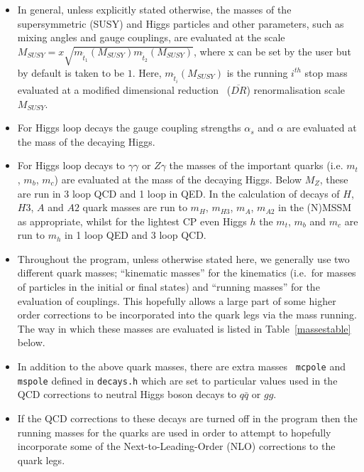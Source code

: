 \documentclass[final,3p,times]{elsarticle}
\begin{document}
\begin{itemize}
\item In general, unless explicitly stated otherwise, the masses of the
  supersymmetric (SUSY) and Higgs particles and other parameters, such as
  mixing angles and gauge couplings, are evaluated at the scale $M_{SUSY} =
  x\sqrt{m_{\tilde{t}_1}(M_{SUSY})m_{\tilde{t}_2}(M_{SUSY})}$, where x can be
  set by the user but by default is taken to be $1$. Here,
  $m_{\tilde{t}_i}(M_{SUSY})$ is the running $i^{th}$ stop mass evaluated at
  a modified dimensional reduction~\cite{Jones:1994} ($\overline{DR}$) renormalisation scale
  $M_{SUSY}$.  
\item For Higgs loop decays the gauge coupling strengths $\alpha_s$ and $\alpha$ are evaluated at the mass of the decaying Higgs.
\item For Higgs loop decays to $\gamma\gamma$ or $Z\gamma$ the masses of the
 important  quarks (i.e. $m_{t}$, $m_{b}$,  $m_{c}$) are evaluated at
 the mass of the decaying Higgs. Below $M_Z$, these are run in 3 loop
 QCD and 1 loop in QED\@. 
In the calculation of decays of $H$, $H3$, $A$ and $A2$ quark masses  are run
to $m_H$, $m_{H3}$, $m_{A}$, $m_{A2}$ 
in the (N)MSSM as appropriate, whilst for the lightest CP even Higgs $h$ the
$m_{t}$, $m_{b}$ and $m_{c}$ are run to $m_h$ in 1 loop QED and 3 loop QCD. 
\item Throughout the program, unless otherwise stated here, we generally use two
  different quark masses; ``kinematic masses'' for the kinematics (i.e.\ for
  masses of particles in the initial or final states) and ``running masses''
  for the evaluation of couplings.  This hopefully allows a large part of some
  higher order  corrections 
  to be incorporated into the quark legs via the mass
  running. The way in which these masses are evaluated is listed in Table~\ref{massestable} below. 
\item In addition to the above quark masses, there are extra masses {\tt
    mcpole} and {\tt mspole} defined in {\tt decays.h} which are set
  to particular values used in the QCD corrections to neutral
  Higgs boson decays to $q \bar{q}$ or $gg$. 
\item If the QCD corrections to these decays are turned off in the program then
  the running masses for the quarks are used in order to attempt to hopefully
  incorporate some of the Next-to-Leading-Order (NLO) corrections to the quark
  legs. 
\end{itemize}
\end{document}
